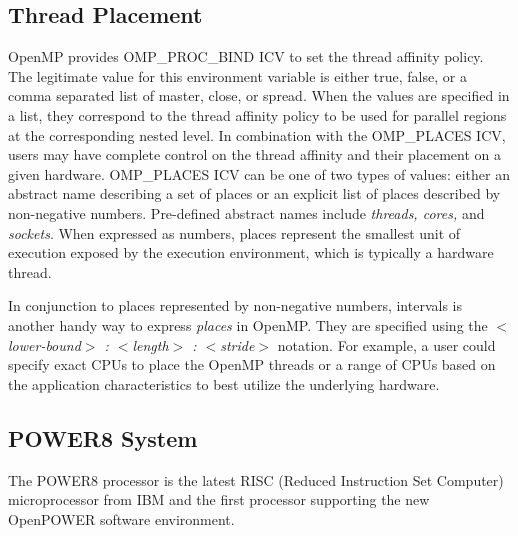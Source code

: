 \subsection{Thread Placement}
OpenMP provides OMP\_PROC\_BIND ICV to set the thread affinity policy. The legitimate value for 
this environment variable is either true, false, or a comma separated list of master, close, or spread. 
When the values are specified in a list, they correspond to the thread affinity policy to be used for 
parallel regions at the corresponding nested level. In combination with the OMP\_PLACES ICV, 
users may have complete control on the thread affinity and their placement on a given hardware. 
OMP\_PLACES ICV can be one of two types of values: either an abstract name describing a set 
of places or an explicit list of places described by non-negative numbers. Pre-defined abstract 
names include \textit{threads, cores,} and \textit{sockets}. When expressed as numbers, places 
represent the smallest unit of execution exposed by the execution environment, which is typically 
a hardware thread.

In conjunction to places represented by non-negative numbers, intervals is another handy way to 
express \textit{places} in OpenMP. They are specified using the \textit{$<$lower-bound$>$ : $<$length$>$ : $<$stride$>$} notation. For example, a user could specify exact CPUs to place the OpenMP threads or a range of CPUs based on the application characteristics to best utilize the underlying hardware.


\subsection{POWER8 System}
The POWER8 processor is the latest RISC (Reduced Instruction Set Computer) microprocessor from IBM and the first processor supporting the new OpenPOWER software environment. 

